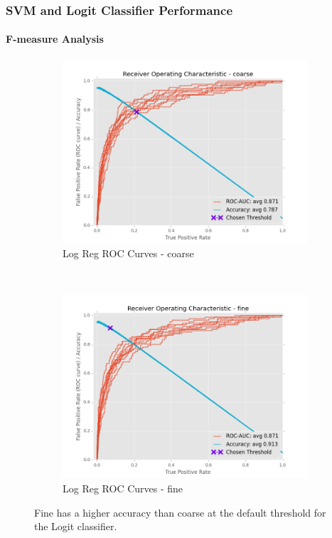 \documentclass{beamer}
\begin{document}
\begin{frame}
    \frametitle{SVM and Logit Classifier Performance}
    \framesubtitle{F-measure Analysis}
    \begin{figure}[!htb]
        \centering
        \begin{subfigure}[t]{0.475\textwidth}
            \centering
            \includegraphics[width=\textwidth]{fig/LogReg_FindThreshold_RocCurve_coarse}
            \caption{Log Reg ROC Curves - coarse}
        \end{subfigure}%
        ~
        \begin{subfigure}[t]{0.475\textwidth}
            \centering
            \includegraphics[width=\textwidth]{fig/LogReg_FindThreshold_RocCurve_fine}
            \caption{Log Reg ROC Curves - fine}
        \end{subfigure}
        \caption{Fine has a higher accuracy than coarse at the default threshold for the Logit classifier.}
        \label{fig:LogRegThreshAcc}
    \end{figure}
\end{frame}
\end{document}
